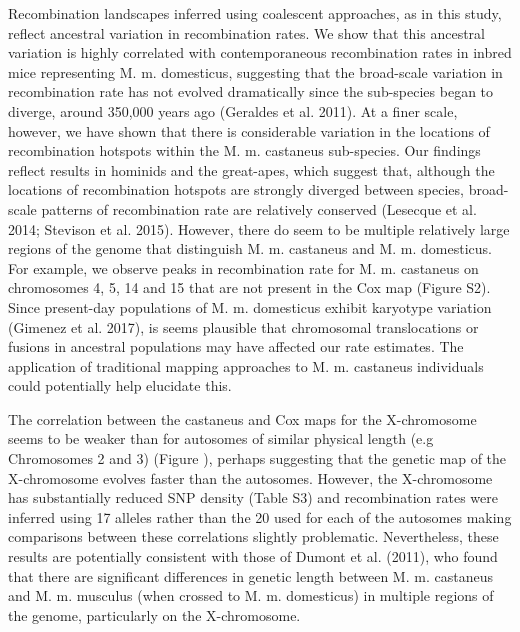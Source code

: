 Recombination landscapes inferred using coalescent approaches, as in this study, reflect ancestral variation in recombination rates. We show that this ancestral variation is highly correlated with contemporaneous recombination rates in inbred mice representing M. m. domesticus, suggesting that the broad-scale variation in recombination rate has not evolved dramatically since the sub-species began to diverge, around 350,000 years ago (Geraldes et al. 2011). At a finer scale, however, we have shown that there is considerable variation in the locations of recombination hotspots within the M. m. castaneus sub-species. Our findings reflect results in hominids and the great-apes, which suggest that, although the locations of recombination hotspots are strongly diverged between species, broad-scale patterns of recombination rate are relatively conserved (Lesecque et al. 2014; Stevison et al. 2015). However, there do seem to be multiple relatively large regions of the genome that distinguish M. m. castaneus and M. m. domesticus. For example, we observe peaks in recombination rate for M. m. castaneus on chromosomes 4, 5, 14 and 15 that are not present in the Cox map (Figure S2). Since present-day populations of M. m. domesticus exhibit karyotype variation (Gimenez et al. 2017), is seems plausible that chromosomal translocations or fusions in ancestral populations may have affected our rate estimates. The application of traditional mapping approaches to M. m. castaneus individuals could potentially help elucidate this.

The correlation between the castaneus and Cox maps for the X-chromosome seems to be weaker than for autosomes of similar physical length (e.g Chromosomes 2 and 3) (Figure ), perhaps suggesting that the genetic map of the X-chromosome evolves faster than the autosomes. However, the X-chromosome has substantially reduced SNP density (Table S3) and recombination rates were inferred using 17 alleles rather than the 20 used for each of the autosomes making comparisons between these correlations slightly problematic. Nevertheless, these results are potentially consistent with those of Dumont et al. (2011), who found that there are significant differences in genetic length between M. m. castaneus and M. m. musculus (when crossed to M. m. domesticus) in multiple regions of the genome, particularly on the X-chromosome.

